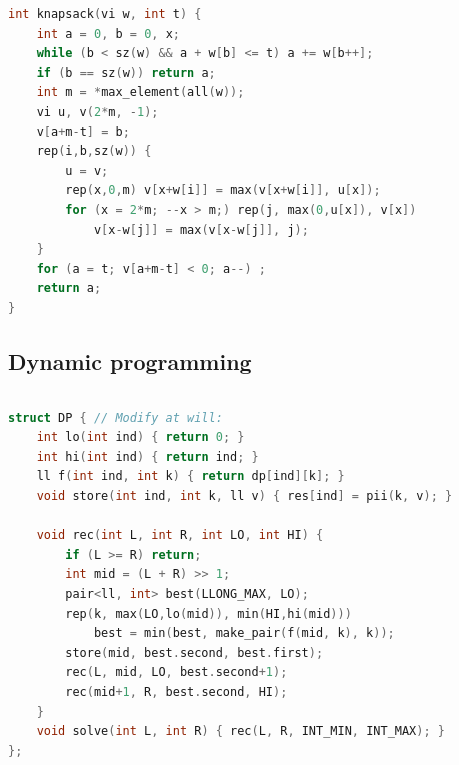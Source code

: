 \begin{multicols}{\Columns}
\begin{lstlisting}[language=C++]
int knapsack(vi w, int t) {
	int a = 0, b = 0, x;
	while (b < sz(w) && a + w[b] <= t) a += w[b++];
	if (b == sz(w)) return a;
	int m = *max_element(all(w));
	vi u, v(2*m, -1);
	v[a+m-t] = b;
	rep(i,b,sz(w)) {
		u = v;
		rep(x,0,m) v[x+w[i]] = max(v[x+w[i]], u[x]);
		for (x = 2*m; --x > m;) rep(j, max(0,u[x]), v[x])
			v[x-w[j]] = max(v[x-w[j]], j);
	}
	for (a = t; v[a+m-t] < 0; a--) ;
	return a;
}
\end{lstlisting}


\subsection{Dynamic programming}
\begin{lstlisting}[language=C++]

\end{lstlisting}

\begin{lstlisting}[language=C++]
struct DP { // Modify at will:
	int lo(int ind) { return 0; }
	int hi(int ind) { return ind; }
	ll f(int ind, int k) { return dp[ind][k]; }
	void store(int ind, int k, ll v) { res[ind] = pii(k, v); }

	void rec(int L, int R, int LO, int HI) {
		if (L >= R) return;
		int mid = (L + R) >> 1;
		pair<ll, int> best(LLONG_MAX, LO);
		rep(k, max(LO,lo(mid)), min(HI,hi(mid)))
			best = min(best, make_pair(f(mid, k), k));
		store(mid, best.second, best.first);
		rec(L, mid, LO, best.second+1);
		rec(mid+1, R, best.second, HI);
	}
	void solve(int L, int R) { rec(L, R, INT_MIN, INT_MAX); }
};
\end{lstlisting}



\end{multicols}

